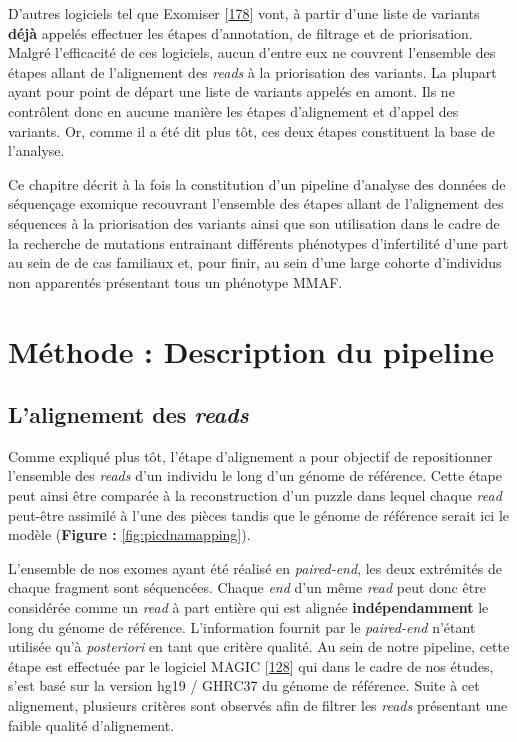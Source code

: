 \documentclass[12pt,twoside]{reedthesis}
\theoremstyle{definition}
\theoremstyle{definition}
\theoremstyle{remark}
\begin{document}
  D'autres logiciels tel que Exomiser
  {[}\protect\hyperlink{ref-Robinson2014}{178}{]} vont, à partir d'une
  liste de variants \textbf{déjà} appelés effectuer les étapes
  d'annotation, de filtrage et de priorisation. Malgré l'efficacité de ces
  logiciels, aucun d'entre eux ne couvrent l'ensemble des étapes allant de
  l'alignement des \emph{reads} à la priorisation des variants. La plupart
  ayant pour point de départ une liste de variants appelés en amont. Ils
  ne contrôlent donc en aucune manière les étapes d'alignement et d'appel
  des variants. Or, comme il a été dit plus tôt, ces deux étapes
  constituent la base de l'analyse.
  
  Ce chapitre décrit à la fois la constitution d'un pipeline d'analyse des
  données de séquençage exomique recouvrant l'ensemble des étapes allant
  de l'alignement des séquences à la priorisation des variants ainsi que
  son utilisation dans le cadre de la recherche de mutations entrainant
  différents phénotypes d'infertilité d'une part au sein de de cas
  familiaux et, pour finir, au sein d'une large cohorte d'individus non
  apparentés présentant tous un phénotype MMAF.
  
  \newpage
  
  \section{Méthode : Description du
  pipeline}\label{methode-description-du-pipeline}
  
  \subsection{\texorpdfstring{L'alignement des
  \emph{reads}}{L'alignement des reads}}\label{lalignement-des-reads}
  
  Comme expliqué plus tôt, l'étape d'alignement a pour objectif de
  repositionner l'ensemble des \emph{reads} d'un individu le long d'un
  génome de référence. Cette étape peut ainsi être comparée à la
  reconstruction d'un puzzle dans lequel chaque \emph{read} peut-être
  assimilé à l'une des pièces tandis que le génome de référence serait ici
  le modèle (\textbf{Figure : }\ref{fig:picdnamapping}).
  
  L'ensemble de nos exomes ayant été réalisé en \emph{paired-end}, les
  deux extrémités de chaque fragment sont séquencées. Chaque \emph{end}
  d'un même \emph{read} peut donc être considérée comme un \emph{read} à
  part entière qui est alignée \textbf{indépendamment} le long du génome
  de référence. L'information fournit par le \emph{paired-end} n'étant
  utilisée qu'à \emph{posteriori} en tant que critère qualité. Au sein de
  notre pipeline, cette étape est effectuée par le logiciel MAGIC
  {[}\protect\hyperlink{ref-Su2014}{128}{]} qui dans le cadre de nos
  études, s'est basé sur la version hg19 / GHRC37 du génome de référence.
  Suite à cet alignement, plusieurs critères sont observés afin de filtrer
  les \emph{reads} présentant une faible qualité d'alignement.
  
\end{document}
